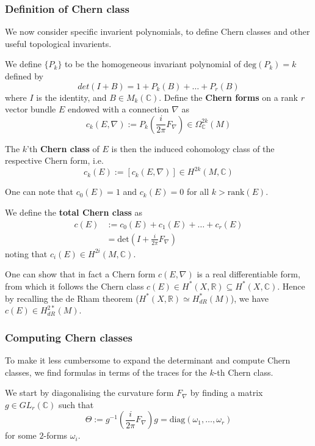 \documentclass[a4paper]{article}
\theoremstyle{definition} \newtheorem*{definition}{Definition}
\theoremstyle{definition} \newtheorem*{definitions}{Definitions}
\theoremstyle{plain} \newtheorem{theorem}{Theorem}[section]
\theoremstyle{plain} \newtheorem{proposition}[theorem]{Proposition}
\theoremstyle{plain} \newtheorem{corollary}[theorem]{Corollary}
\theoremstyle{plain} \newtheorem{lemma}[theorem]{Lemma}
\theoremstyle{plain} \newtheorem{example}[theorem]{Example}
\newcommand{\defn}[1]{\textbf{#1}}
\newcommand{\realnos}{\mathbb{R}}
\newcommand{\complexnos}{\mathbb{C}}
\begin{document}
\subsubsection{Definition of Chern class}
We now consider specific invarient polynomials, to define Chern classes and other useful topological invarients. 

We define $\{P_k\}$ to be the homogeneous invariant polynomial of $\text{deg}(P_k)=k$ defined by 
$$det(I+B)=1+P_k(B)+\ldots +P_r(B)$$
where $I$ is the identity, and $B\in M_k(\complexnos)$. Define the \defn{Chern forms} on a rank $r$ vector bundle $E$ endowed with a connection $\nabla$ as 
$$c_k(E, \nabla):=P_k \left( \frac{i}{2\pi} F_\nabla \right) \in \Omega^{2k}_\complexnos (M)$$

The $k$'th \defn{Chern class} of $E$ is then the induced cohomology class of the respective Chern form, i.e. 
$$c_k(E):= [c_k(E, \nabla)] \in H^{2k}(M, \complexnos)$$

One can note that $c_0(E)=1$ and $c_k(E)=0$ for all $k>\text{rank}(E)$. 

We define the \defn{total Chern class} as 
\begin{align*}
c(E)& :=c_0(E)+c_1(E)+\ldots +c_r(E) \\
& = \text{det} \left( I + \frac{i}{2\pi} F_\nabla \right)
\end{align*}
noting that $c_i(E)\in H^{2i}(M, \complexnos)$.

One can show that in fact a Chern form $c(E, \nabla)$ is a real differentiable form, from which it follows the Chern class $c(E)\in H^*(X, \realnos)\subseteq H^*(X, \complexnos)$.  Hence by recalling the de Rham theorem ($H^*(X, \realnos)\simeq H^*_{dR}(M)$), we have $c(E)\in H^{2*}_{dR}(M)$.

\subsubsection{Computing Chern classes}
To make it less cumbersome to expand the determinant and compute Chern classes, we find formulas in terms of the traces for the $k$-th Chern class. 

We start by diagonalising the curvature form $F_\nabla$ by finding a matrix $g\in GL_r(\complexnos)$ such that
$$\Theta := g^{-1}\left( \frac{i}{2\pi} F_\nabla \right) g = \text{diag}(\omega_1, \ldots, \omega_r)$$
for some $2$-forms $\omega_i$. 
\end{document}
